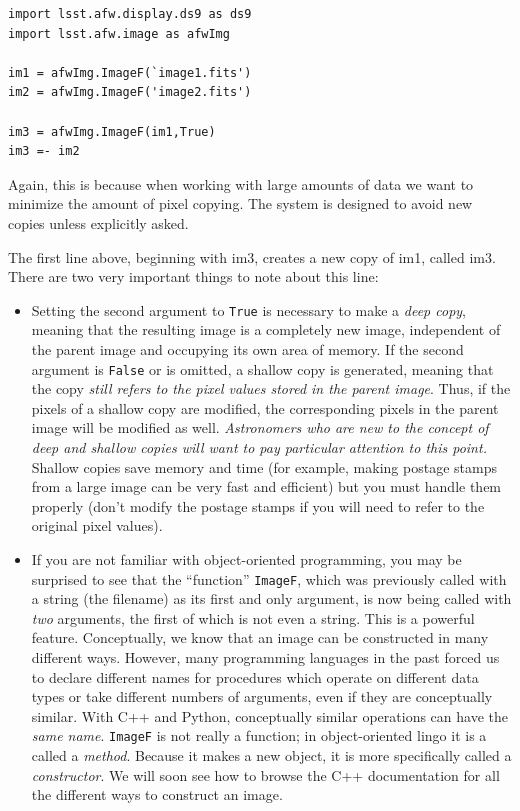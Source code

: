 \begin{verbatim}
import lsst.afw.display.ds9 as ds9
import lsst.afw.image as afwImg

im1 = afwImg.ImageF(`image1.fits')
im2 = afwImg.ImageF('image2.fits')

im3 = afwImg.ImageF(im1,True)
im3 =- im2
\end{verbatim}

Again, this is because when working with large amounts of data we want
to minimize the amount of pixel copying.  The system is designed to
avoid new copies unless explicitly asked.

The first line above, beginning with im3, creates a new copy of im1, called im3.  There are
two very important things to note about this line:

\begin{itemize}

\item Setting the second argument to \texttt{True} is necessary to
  make a {\it deep copy}, meaning that the resulting image is a
  completely new image, independent of the parent image and occupying
  its own area of memory.  If the second argument is \texttt{False} or
  is omitted, a shallow copy is generated, meaning that the copy {\it
    still refers to the pixel values stored in the parent image}.
  Thus, if the pixels of a shallow copy are modified, the
  corresponding pixels in the parent image will be modified as well.
  {\it Astronomers who are new to the concept of deep and shallow
    copies will want to pay particular attention to this point.}
  Shallow copies save memory and time (for example, making postage
  stamps from a large image can be very fast and efficient) but you
  must handle them properly (don't modify the postage stamps if you
  will need to refer to the original pixel values).

\item If you are not familiar with object-oriented programming, you
  may be surprised to see that the ``function'' \texttt{ImageF}, which
  was previously called with a string (the filename) as its first and
  only argument, is now being called with {\it two} arguments, the
  first of which is not even a string.  This is a powerful
  feature. Conceptually, we know that an image can be constructed in
  many different ways.  However, many programming languages in the
  past forced us to declare different names for procedures which
  operate on different data types or take different numbers of
  arguments, even if they are conceptually similar.  With C++ and
  Python, conceptually similar operations can have the {\it same
    name}.  \texttt{ImageF} is not really a function; in
  object-oriented lingo it is a called a {\it method}.  Because it
  makes a new object, it is more specifically called a {\it
    constructor}.  We will soon see how to browse the C++
  documentation for all the different ways to construct an image.

\end{itemize}

